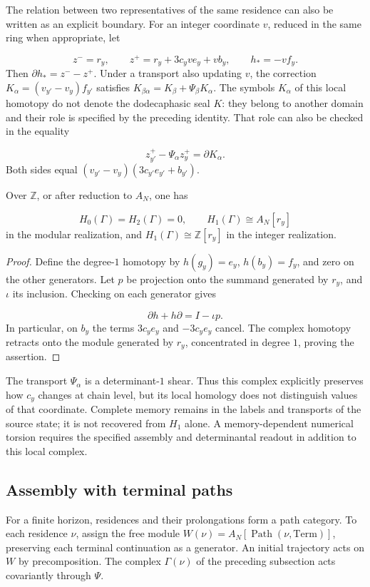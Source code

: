 The relation between two representatives of the same residence can also be written as an explicit boundary. For an integer coordinate \(v\), reduced in the same ring when appropriate, let

\[
z^-=r_y,\qquad z^+=r_y+3c_yv e_y+v b_y,
\qquad h_*=-vf_y.
\]
Then \(\partial h_*=z^--z^+\). Under a transport also updating \(v\), the correction \(K_\alpha=(v_{y'}-v_y)f_{y'}\) satisfies \(K_{\beta\alpha}=K_\beta+\Psi_\beta K_\alpha\). The symbols \(K_\alpha\) of this local homotopy do not denote the dodecaphasic seal \(K\): they belong to another domain and their role is specified by the preceding identity. That role can also be checked in the equality

\[
z^+_{y'}-\Psi_\alpha z^+_y=\partial K_\alpha.
\]
Both sides equal \((v_{y'}-v_y)(3c_{y'}e_{y'}+b_{y'})\).

\begin{proposition}
\label{iv:cont:memoria-homologia}
Over \(\mathbb Z\), or after reduction to \(A_N\), one has

\[
H_0(\Gamma)=H_2(\Gamma)=0,
\qquad H_1(\Gamma)\cong A_N[r_y]
\]
in the modular realization, and \(H_1(\Gamma)\cong\mathbb Z[r_y]\) in the integer realization.

\end{proposition}
\begin{proof}
Define the degree-\(1\) homotopy by \(h(g_y)=e_y\), \(h(b_y)=f_y\), and zero on the other generators. Let \(p\) be projection onto the summand generated by \(r_y\), and \(\iota\) its inclusion. Checking on each generator gives

\[
\partial h+h\partial=I-\iota p.
\]
In particular, on \(b_y\) the terms \(3c_ye_y\) and \(-3c_ye_y\) cancel. The complex homotopy retracts onto the module generated by \(r_y\), concentrated in degree \(1\), proving the assertion.
\end{proof}

The transport \(\Psi_\alpha\) is a determinant-\(1\) shear. Thus this complex explicitly preserves how \(c_y\) changes at chain level, but its local homology does not distinguish values of that coordinate. Complete memory remains in the labels and transports of the source state; it is not recovered from \(H_1\) alone. A memory-dependent numerical torsion requires the specified assembly and determinantal readout in addition to this local complex.

\subsection{Assembly with terminal paths}
\label{iv:cont:ensamblaje}
For a finite horizon, residences and their prolongations form a path category. To each residence \(\nu\), assign the free module \(W(\nu)=A_N[\operatorname{Path}(\nu,\mathrm{Term})]\), preserving each terminal continuation as a generator. An initial trajectory acts on \(W\) by precomposition. The complex \(\Gamma(\nu)\) of the preceding subsection acts covariantly through \(\Psi\).

